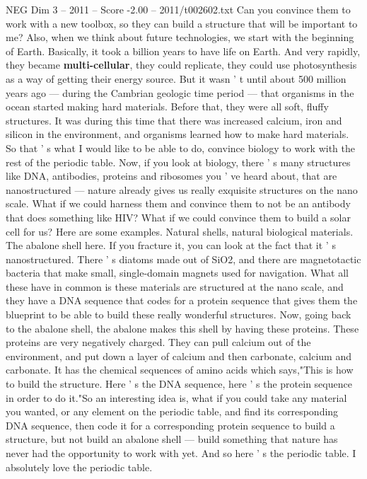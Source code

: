 \begin{textsample}{NEG Dim 3 – 2011 – Score -2.00 – 2011/t002602.txt}
Can you convince them to work with a new toolbox, so they can build a structure that will be important to me?
Also, when we think about future technologies, we start with the beginning of Earth.
Basically, it took a billion years to have life on Earth.
And very rapidly, they became \textbf{multi-cellular}, they could replicate, they could use photosynthesis as a way of getting their energy source.
But it wasn ' t until about 500 million years ago — during the Cambrian geologic time period — that organisms in the ocean started making hard materials.
Before that, they were all soft, fluffy structures.
It was during this time that there was increased calcium, iron and silicon in the environment, and organisms learned how to make hard materials.
So that ' s what I would like to be able to do, convince biology to work with the rest of the periodic table.
Now, if you look at biology, there ' s many structures like DNA, antibodies, proteins and ribosomes you ' ve heard about, that are nanostructured — nature already gives us really exquisite structures on the nano scale.
What if we could harness them and convince them to not be an antibody that does something like HIV?
What if we could convince them to build a solar cell for us?
Here are some examples.
Natural shells, natural biological materials.
The abalone shell here.
If you fracture it, you can look at the fact that it ' s nanostructured.
There ' s diatoms made out of SiO2, and there are magnetotactic bacteria that make small, single-domain magnets used for navigation.
What all these have in common is these materials are structured at the nano scale, and they have a DNA sequence that codes for a protein sequence that gives them the blueprint to be able to build these really wonderful structures.
Now, going back to the abalone shell, the abalone makes this shell by having these proteins.
These proteins are very negatively charged.
They can pull calcium out of the environment, and put down a layer of calcium and then carbonate, calcium and carbonate.
It has the chemical sequences of amino acids which says,"This is how to build the structure.
Here ' s the DNA sequence, here ' s the protein sequence in order to do it."So an interesting idea is, what if you could take any material you wanted, or any element on the periodic table, and find its corresponding DNA sequence, then code it for a corresponding protein sequence to build a structure, but not build an abalone shell — build something that nature has never had the opportunity to work with yet.
And so here ' s the periodic table.
I absolutely love the periodic table.

\end{textsample}
